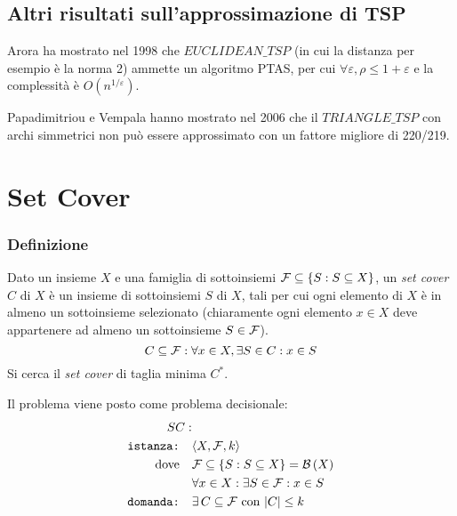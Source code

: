 \subsection{Altri risultati sull'approssimazione di TSP}

Arora ha mostrato nel 1998 \cite{Arora:1998:PTA:290179.290180} che $EUCLIDEAN\_TSP$ (in cui la distanza per esempio è la norma 2) ammette un algoritmo PTAS,
per cui
$
\forall \varepsilon,
\rho \leq 1+\varepsilon
$
e la complessità è $
O \left( n^{1/\varepsilon} \right)
$.

Papadimitriou e Vempala hanno mostrato nel 2006 \cite{Papadimitriou:2006:s00493-006-0008-z} che il $TRIANGLE\_TSP$ con archi simmetrici non può essere approssimato con un fattore migliore di 220/219.

\section{Set Cover}

\subsubsection{Definizione}

Dato un insieme $X$ e
una famiglia di sottoinsiemi
$
\mathcal{F} \subseteq \left\{ S : S \subseteq X \right\}
$,
un \emph{set cover } $C$ di $X$ è un insieme di sottoinsiemi $S$ di $X$, tali per cui ogni elemento di $X$ è in almeno un sottoinsieme selezionato
(chiaramente ogni elemento $x \in X$ deve appartenere ad almeno un sottoinsieme $S \in \mathcal{F}$).
\begin{equation*}
    C \subseteq \mathcal{F} : 
    \forall x \in X, \exists S \in C :
    x \in S
\end{equation*}
Si cerca il \emph{set cover} di taglia minima $C^*$.

Il problema viene posto come problema decisionale:
\begin{align*}
    SC: & \\
    \texttt{istanza:} \quad & \langle X, \mathcal{F}, k \rangle \\
    \text{dove} \quad &
    \mathcal{F} \subseteq \left\{ S : S \subseteq X \right\} = \mathcal{B} \left( X \right)
    \\
    & \forall  x \in X : \exists S \in \mathcal{F} : x \in S
    \\
    \texttt{domanda:} \quad &
    \exists \, C \subseteq \mathcal{F} \text{ con } |C| \leq k
\end{align*}

